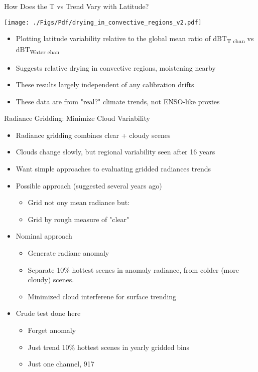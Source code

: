 \documentclass[10pt,t]{beamer}
\begin{document}
\begin{frame}[label={sec:org58fdc72}]{How Does the T vs \water Trend Vary with Latitude?}
\vspace{-0.1in}
\begin{center}
\texttt{[image: ./Figs/Pdf/drying\_in\_convective\_regions\_v2.pdf]}
\end{center}

\vspace{-0.12in}
\begin{itemize}
\item \small Plotting latitude variability relative to the global mean ratio of dBT\textsubscript{T chan} vs dBT\textsubscript{Water chan}
\item \small Suggests relative drying in convective regions, moistening nearby
\item \small These results largely independent of any calibration drifts
\item \small These data are from "real?" climate trends, not ENSO-like proxies
\end{itemize}
\end{frame}

\begin{frame}[label={sec:orgb3e18be}]{Radiance Gridding: Minimize Cloud Variability}
\begin{itemize}
\item Radiance gridding combines clear + cloudy scenes
\item Clouds change slowly, but regional variability seen after 16 years
\item Want simple approaches to evaluating gridded radiances trends
\item Possible approach (suggested several years ago)
\begin{itemize}
\item Grid not ony mean radiance but:
\item Grid by rough measure of "clear"
\end{itemize}
\item Nominal approach
\begin{itemize}
\item Generate radiane anomaly
\item Separate 10\% hottest scenes in anomaly radiance, from colder (more cloudy) scenes.
\item Minimized cloud interferene for surface trending
\end{itemize}
\item Crude test done here
\begin{itemize}
\item Forget anomaly
\item Just trend 10\% hottest scenes in yearly gridded bins
\item Just one channel, 917 \wn
\end{itemize}
\end{itemize}
\end{frame}
\end{document}
